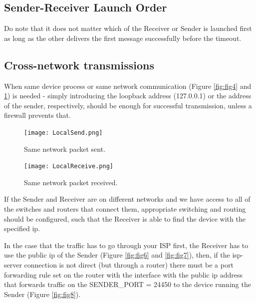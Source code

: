 \documentclass[12pt]{article}
\begin{document}
\subsection{Sender-Receiver Launch Order}

Do note that it does not matter which of the Receiver or Sender is launched first as long as the other delivers the first message successfully before the timeout.

\subsection{Cross-network transmissions}

When same device process or same network communication (Figure \ref{fig:fig4} and \ref{fig:fig5}) is needed - simply introducing the loopback address (127.0.0.1) or the address of the sender, respectively, should be enough for successful transmission, unless a firewall prevents that.

\begin{figure}[!htb]
	\begin{minipage}{0.48\textwidth}
		\centering
		\texttt{[image: LocalSend.png]}
		\caption{Same network packet sent.}\label{fig:fig4}
	\end{minipage}\hfill
	\begin{minipage}{0.48\textwidth}
		\centering
		\texttt{[image: LocalReceive.png]}
		\caption{Same network packet received.}\label{fig:fig5}
	\end{minipage}\hfill
\end{figure}

If the Sender and Receiver are on different networks and we have access to all of the switches and routers that connect them, appropriate switching and routing should be configured, such that the Receiver is able to find the device with the specified ip.

In the case that the traffic has to go through your ISP first, the Receiver has to use the public ip of the Sender (Figure \ref{fig:fig6} and \ref{fig:fig7}), then, if the isp-server connection is not direct (but through a router) there must be a port forwarding rule set on the router with the interface with the public ip address that forwards traffic on the SENDER_PORT = 24450 to the device running the Sender (Figure \ref{fig:fig8}).
\end{document}
